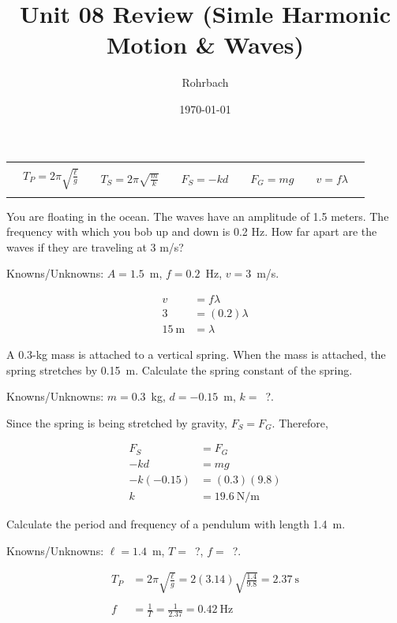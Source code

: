 \documentclass[10pt]{exam}
\title{Unit 08 Review (Simle Harmonic Motion \& Waves)}
\author{Rohrbach}
\date{\today}
\newcommand{\printeqs}{
  \ifprintanswers
  \else
    \begin{center}
      \begin{tabular}{|*{11}{c}|}
        \hline 
        &&&&&&&&&&\\
        &
        $T_P=2\pi\sqrt{\frac{\ell}{g}}$ &&
        $T_S=2\pi\sqrt{\frac{m}{k}}$ &&
        $F_S=-kd$ &&
        $F_G=mg$ &&
        $v=f\lambda$&\\
        &&&&&&&&&&\\
        \hline
      \end{tabular}
    \end{center}
  \fi
}
\begin{document}
\maketitle

\printeqs

\begin{questions}

\question 
  You are floating in the ocean.  The waves have an amplitude of 1.5 meters.  The frequency with which you bob up and down is 0.2 Hz.  How far apart are the waves if they are traveling at 3 m/s?
  
  \begin{solution}[\stretch{1}]
    Knowns/Unknowns: $A=1.5$~m, $f=0.2$~Hz, $v=3$~m/s.

    \begin{align*}
      v &= f\lambda \\
      3 &= (0.2)\lambda \\
      \SI{15}{\meter} &= \lambda
    \end{align*}

  \end{solution}

\question
  A 0.3-kg mass is attached to a vertical spring. When the mass is attached, the spring stretches by 0.15~m. Calculate the spring constant of the spring.

  \begin{solution}[\stretch{1}]
    Knowns/Unknowns: $m=0.3$~kg, $d=-0.15$~m, $k=$~?.

    Since the spring is being stretched by gravity, $F_S=F_G$.  Therefore,

    \begin{align*}
      F_S &= F_G \\
      -kd &= mg  \\
      -k(-0.15) &= (0.3)(9.8) \\
      k &= \SI{19.6}{\newton\per\meter}
    \end{align*}

  \end{solution}

\question
  Calculate the period and frequency of a pendulum with length 1.4~m.

  \begin{solution}[\stretch{1}]
    Knowns/Unknowns: $\ell=1.4$~m, $T=$~?, $f=$~?.

    \begin{align*}
      T_P &= 2\pi \sqrt{\frac{\ell}{g}} 
            = 2(3.14) \sqrt{\frac{1.4}{9.8}} 
            = \SI{2.37}{\second} \\\\
      f   &= \frac{1}{T} = \frac{1}{2.37} = \SI{0.42}{\hertz}
    \end{align*}


\end{solution}
\end{questions}
\end{document}
